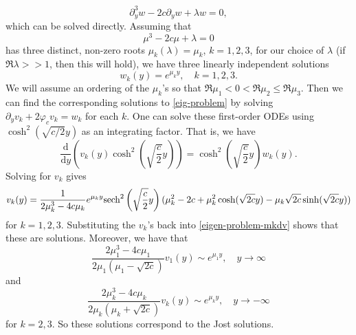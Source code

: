 \begin{equation}
	\partial_y^3 w - 2c \partial_y w + \lambda w = 0,
\end{equation}
which can be solved directly. Assuming that 
\begin{equation}
	\mu^3 - 2 c \mu + \lambda = 0
\end{equation}
has three distinct, non-zero roots \(\mu_k(\lambda) = \mu_k\), \(k =1,2,3\),  for our choice of \(\lambda\) (if \(\Re \lambda >> 1\), then this will hold), we have three linearly independent solutions 
\begin{equation}
	w_k(y)  = e^{\mu_k y}, \quad k =1,2,3.
\end{equation}
We will assume an ordering of the \(\mu_k\)'s so that \(\Re \mu_1 < 0 < \Re \mu_2 \leq \Re \mu_3\). Then we can find the corresponding solutions to \cref{eig-problem} by solving \(\partial_y v_k + 2 \varphi_c v_k = w_k\) for each \(k\). One can solve these first-order ODEs using \(\cosh^2(\sqrt{c/2} y)\) as an integrating factor. That is, we have
\begin{equation}
	\frac{\mathrm{d}}{\mathrm d y}\left( v_k(y) \cosh^2\left( \sqrt{\frac c 2} y\right) \right) =  \cosh^2\left( \sqrt{\frac c 2} y\right) w_k(y).
\end{equation}
Solving for \(v_k\) gives
\begin{equation}
	v_k(y) = \frac{1}{2 \mu_k^3 - 4c\mu_k} e^{\mu_k y} \mathrm{sech}^2\left( \sqrt{\frac c 2} y\right) (\mu_k^2 -2c + \mu_k^2 \cosh(\sqrt{2c} y) - \mu_k \sqrt{2c} \sinh(\sqrt{2c} y))
\end{equation}
for \(k=1,2,3\). Substituting the \(v_k\)'s back into \cref{eigen-problem-mkdv} shows that these are solutions. Moreover, we have that
\begin{equation}\label{yplus}
	\frac{2\mu_1^3 - 4c\mu_1}{2\mu_1(\mu_1 - \sqrt{2c})} v_1(y) \sim e^{\mu_1 y}, \quad y\to\infty
\end{equation}
and
\begin{equation}
	\frac{2\mu_k^3 - 4c\mu_k}{2\mu_k(\mu_k + \sqrt{2c})} v_k(y) \sim e^{\mu_k y}, \quad y\to-\infty
\end{equation}
for \(k = 2,3\). So these solutions correspond to the Jost solutions.

